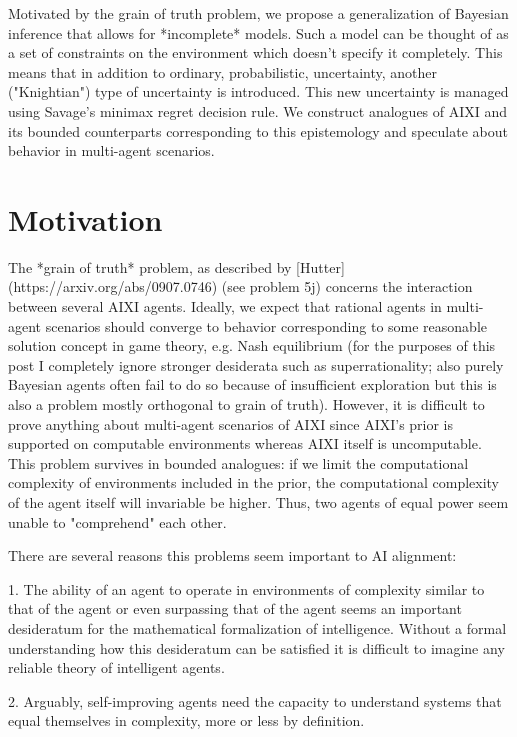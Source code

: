 \documentclass[a4paper]{article}
\begin{document}
Motivated by the grain of truth problem, we propose a generalization of Bayesian inference that allows for *incomplete* models. Such a model can be thought of as a set of constraints on the environment which doesn't specify it completely. This means that in addition to ordinary, probabilistic, uncertainty, another ("Knightian") type of uncertainty is introduced. This new uncertainty is managed using Savage's minimax regret decision rule. We construct analogues of AIXI and its bounded counterparts corresponding to this epistemology and speculate about behavior in multi-agent scenarios.

\section{Motivation}

The *grain of truth* problem, as described by [Hutter](https://arxiv.org/abs/0907.0746) (see problem 5j) concerns the interaction between several AIXI agents. Ideally, we expect that rational agents in multi-agent scenarios should converge to behavior corresponding to some reasonable solution concept in game theory, e.g. Nash equilibrium (for the purposes of this post I completely ignore stronger desiderata such as superrationality; also purely Bayesian agents often fail to do so because of insufficient exploration but this is also a problem mostly orthogonal to grain of truth). However, it is difficult to prove anything about multi-agent scenarios of AIXI since AIXI's prior is supported on computable environments whereas AIXI itself is uncomputable. This problem survives in bounded analogues: if we limit the computational complexity of environments included in the prior, the computational complexity of the agent itself will invariable be higher. Thus, two agents of equal power seem unable to "comprehend" each other.

There are several reasons this problems seem important to AI alignment:

1. The ability of an agent to operate in environments of complexity similar to that of the agent or even surpassing that of the agent seems an important desideratum for the mathematical formalization of intelligence. Without a formal understanding how this desideratum can be satisfied it is difficult to imagine any reliable theory of intelligent agents.

2. Arguably, self-improving agents need the capacity to understand systems that equal themselves in complexity, more or less by definition.
\end{document}
